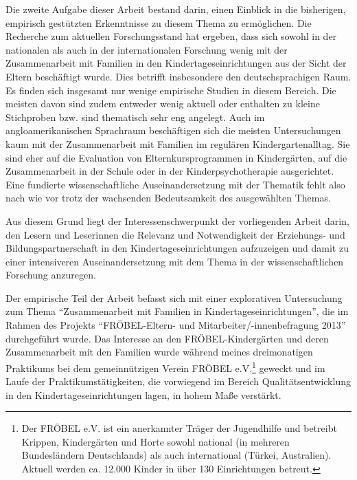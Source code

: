 \documentclass[12pt,a4paper]{article}
\begin{document}
Die zweite Aufgabe dieser Arbeit bestand darin, einen Einblick in die bisherigen, empirisch gestützten Erkenntnisse zu diesem Thema zu ermöglichen. Die Recherche zum aktuellen Forschungsstand hat ergeben, dass sich sowohl in der nationalen als auch in der internationalen Forschung wenig mit der Zusammenarbeit mit Familien in den Kindertageseinrichtungen aus der Sicht der Eltern beschäftigt wurde. Dies betrifft insbesondere den deutschsprachigen Raum.  Es finden sich insgesamt nur wenige empirische Studien in diesem Bereich. Die meisten davon sind zudem entweder wenig aktuell oder enthalten zu kleine Stichproben bzw. sind thematisch sehr eng angelegt. Auch im angloamerikanischen Sprachraum beschäftigen sich die meisten Untersuchungen kaum mit der Zusammenarbeit mit Familien im regulären Kindergartenalltag. Sie sind eher auf die Evaluation von Elternkursprogrammen in Kindergärten, auf die Zusammenarbeit in der Schule oder in der Kinderpsychotherapie ausgerichtet.  
Eine fundierte wissenschaftliche Auseinandersetzung mit der Thematik fehlt also nach wie vor trotz der wachsenden Bedeutsamkeit des ausgewählten Themas.

Aus diesem Grund liegt der Interessenschwerpunkt der vorliegenden Arbeit darin, den Lesern und Leserinnen die Relevanz und Notwendigkeit der Erziehungs- und Bildungspartnerschaft in den Kindertageseinrichtungen aufzuzeigen und damit zu einer intensiveren Auseinandersetzung mit dem Thema in der wissenschaftlichen Forschung anzuregen.
	
Der empirische Teil der Arbeit befasst sich mit einer explorativen Untersuchung zum Thema "`Zusammenarbeit mit Familien in Kindertageseinrichtungen"', die im Rahmen des Projekts "`FRÖBEL-Eltern- und Mitarbeiter/-innenbefragung 2013"' durchgeführt wurde. Das Interesse an den FRÖBEL-Kindergärten und deren Zusammenarbeit mit den Familien wurde während meines dreimonatigen Praktikums bei dem gemeinnützigen Verein FRÖBEL e.V.\footnote{Der FRÖBEL e.V. ist ein anerkannter Träger der Jugendhilfe und betreibt Krippen, Kindergärten und Horte sowohl national (in mehreren Bundesländern Deutschlands) als auch international (Türkei, Australien). Aktuell werden ca. 12.000 Kinder in über 130 Einrichtungen betreut.} geweckt und im Laufe der Praktikumstätigkeiten, die vorwiegend im Bereich Qualitätsentwicklung in den Kindertageseinrichtungen lagen, in hohem Maße verstärkt.
\end{document}
